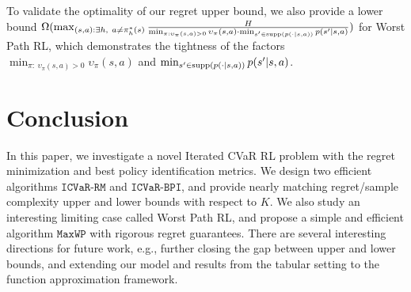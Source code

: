 \documentclass{article} %
\newcommand{\supp}{\textup{supp}}
\newcommand{\algcvar}{\mathtt{ICVaR\mbox{-}RM}}
\newcommand{\algcvarbpi}{\mathtt{ICVaR\mbox{-}BPI}}
\newcommand{\algmin}{\mathtt{MaxWP}}
\begin{document}
	To validate the optimality of our regret upper bound, we also provide a lower bound $\Omega( \max_{ (s,a): \exists h,\ a \neq \pi^{*}_h(s) } \frac{ H }{\min_{ \pi: \upsilon_{\pi}(s,a)>0 } \upsilon_{\pi}(s,a) \cdot \min_{s' \in \supp( p(\cdot|s,a))} p(s'|s,a) } )$ for Worst Path RL, which demonstrates the tightness of the factors $\min_{ \pi: \ \upsilon_{\pi}(s,a)>0} \upsilon_{\pi}(s,a)$ and $\min_{s' \in \supp( p(\cdot|s,a))} p(s'|s,a)$.
	
	
	\vspace*{-0.5em}
	\section{Conclusion} \label{sec:conclusion}
	In this paper, we investigate a novel Iterated CVaR RL problem with the regret minimization and best policy identification metrics. We design two efficient algorithms $\algcvar$ and $\algcvarbpi$, and provide nearly matching regret/sample complexity upper and lower bounds with respect to $K$. We also study an interesting limiting case called Worst Path RL, and propose a simple and efficient algorithm $\algmin$ with rigorous regret guarantees.
	There are several interesting directions for future work, e.g., further closing the gap between upper and lower bounds, and extending our model and results from the tabular setting to the function approximation framework. 
	
	
%	
\end{document}
